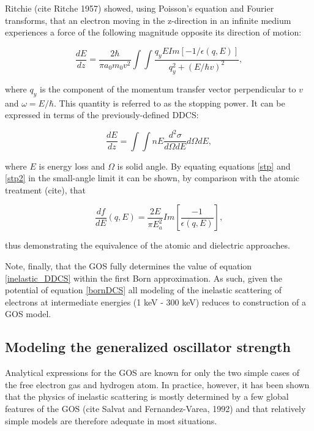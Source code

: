 \documentclass [11pt, proquest, article] {uwthesis}[2016/11/22]
\begin{document}
Ritchie (cite Ritche 1957) showed, using Poisson's equation and Fourier transforms, that an electron moving in the z-direction in an infinite medium experiences a force of the following magnitude opposite its direction of motion: 


\begin{equation} \label{stp}
\frac{dE}{dz} = \frac{2\hbar}{\pi a_0 m_0 v^2} \int \int \frac{q_y E Im[-1/\epsilon(q, E)]}{q_y^2 + (E/\hbar v)^2},
\end{equation}

where $q_y$ is the component of the momentum transfer vector perpendicular to $v$ and $\omega = E/\hbar$. This quantity is referred to as the stopping power. It can be expressed in terms of the previously-defined DDCS:

\begin{equation} \label{stp2}
\frac{dE}{dz} = \int \int n E \frac{d^2\sigma}{d\Omega dE} d\Omega dE,
\end{equation}


where $E$ is energy loss and $\Omega$ is solid angle. By equating equations \ref{stp} and \ref{stp2} in the small-angle limit it can be shown, by comparison with the atomic treatment (cite), that 

$$
\frac{df}{dE}(q, E) = \frac{2E}{\pi E_a^2} Im[\frac{-1}{\epsilon(q, E)}],
$$

thus demonstrating the equivalence of the atomic and dielectric approaches.

Note, finally, that the GOS fully determines the value of equation \ref{inelastic_DDCS} within the first Born approximation. As such, given the potential of equation \ref{bornDCS} all modeling of the inelastic scattering of electrons at intermediate energies (1 keV - 300 keV) reduces to construction of a GOS model. 




\subsection{Modeling the generalized oscillator strength}
Analytical expressions for the GOS are known for only the two simple cases of the free electron gas and hydrogen atom. In practice, however, it has been shown that the physics of inelastic scattering is mostly determined by a few global features of the GOS (cite Salvat and Fernandez-Varea, 1992) and that relatively simple models are therefore adequate in most situations.
\end{document}
